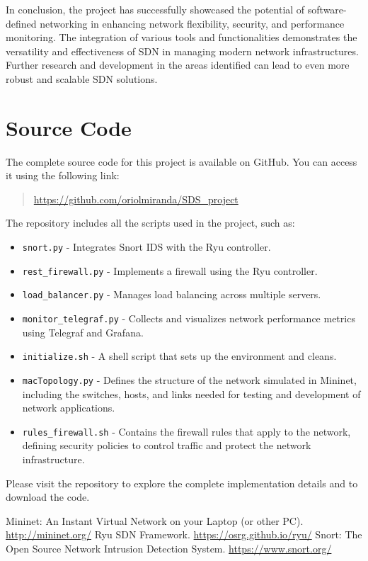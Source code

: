 \documentclass[a4paper,12pt]{article}
\begin{document}
In conclusion, the project has successfully showcased the potential of software-defined networking in enhancing network flexibility, security, and performance monitoring. The integration of various tools and functionalities demonstrates the versatility and effectiveness of SDN in managing modern network infrastructures. Further research and development in the areas identified can lead to even more robust and scalable SDN solutions.




\section{Source Code}

The complete source code for this project is available on GitHub. You can access it using the following link:

\begin{quote}
\url{https://github.com/oriolmiranda/SDS_project}
\end{quote}

The repository includes all the scripts used in the project, such as:

\begin{itemize}
    \item \texttt{snort.py} - Integrates Snort IDS with the Ryu controller.
    \item \texttt{rest\_firewall.py} - Implements a firewall using the Ryu controller.
    \item \texttt{load\_balancer.py} - Manages load balancing across multiple servers.
    \item \texttt{monitor\_telegraf.py} - Collects and visualizes network performance metrics using Telegraf and Grafana.
    \item \texttt{initialize.sh} - A shell script that sets up the environment and cleans.
    \item \texttt{macTopology.py} - Defines the structure of the network simulated in Mininet, including the switches, hosts, and links needed for testing and development of network applications.
    \item \texttt{rules\_firewall.sh} - Contains the firewall rules that apply to the network, defining security policies to control traffic and protect the network infrastructure.
\end{itemize}

Please visit the repository to explore the complete implementation details and to download the code.

\begin{thebibliography}{9}
 Mininet: An Instant Virtual Network on your Laptop (or other PC). \url{http://mininet.org/}
 Ryu SDN Framework. \url{https://osrg.github.io/ryu/}
 Snort: The Open Source Network Intrusion Detection System. \url{https://www.snort.org/}
\end{thebibliography}
\end{document}
